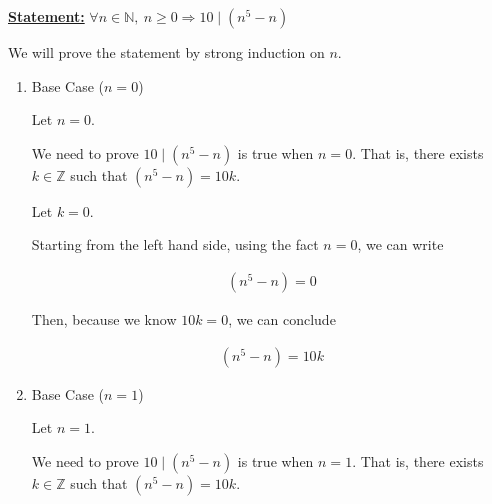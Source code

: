 \documentclass[12pt]{article}
\begin{document}
\begin{itemize}
\begin{itemize}
\begin{itemize}
\begin{mdframed}
                \underline{\textbf{Statement:}} $\forall n \in \mathbb{N},\:n \geq 0 \Rightarrow 10 \mid (n^5 - n)$

                \bigskip

                We will prove the statement by strong induction on $n$.

                \begin{enumerate}[1.]
                    \item Base Case ($n = 0$)

                    \begin{mdframed}

                    Let $n = 0$.

                    \bigskip

                    We need to prove $10 \mid (n^5 - n)$ is true when $n = 0$. That is,
                    there exists $k \in \mathbb{Z}$ such that $(n^5 - n) = 10k$.

                    \bigskip

                    Let $k = 0$.

                    \bigskip

                    Starting from the left hand side, using the fact $n = 0$,
                    we can write

                    \begin{align}
                        (n^5 - n) = 0
                    \end{align}

                    \bigskip

                    Then, because we know $10k = 0$, we can conclude

                    \begin{align}
                        (n^5 - n) = 10k
                    \end{align}

                    \end{mdframed}

                    \item Base Case ($n = 1$)

                    \begin{mdframed}

                    Let $n = 1$.

                    \bigskip

                    We need to prove $10 \mid (n^5 - n)$ is true when $n = 1$. That is,
                    there exists $k \in \mathbb{Z}$ such that $(n^5 - n) = 10k$.


\end{mdframed}
\end{enumerate}
\end{mdframed}
\end{itemize}
\end{itemize}
\end{itemize}
\end{document}
